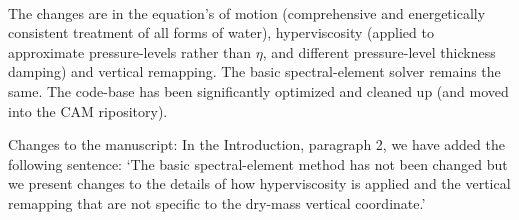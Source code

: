 \documentclass[11pt]{article}
\begin{document}
{\color{red}{
Other than the moist-mass effects, have there been any fundamental improvements to the discretization in CAM-SE? Some of the changes demonstrated in the paper are just re-configuration of runtime parameters. Figure 6 shows a major change in the kinetic energy spectrum, but this should be simply due to the new choice of parameters, and doesn't seem to be due to fundamental improvments in the solver. }}\\

The changes are in the equation's of motion (comprehensive and energetically consistent treatment of all forms of water), hyperviscosity (applied to approximate pressure-levels rather than $\eta$, and different pressure-level thickness damping) and vertical remapping. The basic spectral-element solver remains the same. The code-base has been significantly optimized and cleaned up (and moved into the CAM ripository).

Changes to the manuscript: In the Introduction, paragraph 2, we have added the following sentence: `The basic spectral-element method has not been changed but we present changes to the details of how hyperviscosity is applied and the vertical remapping that are not specific to the dry-mass vertical coordinate.' 
\end{document}
